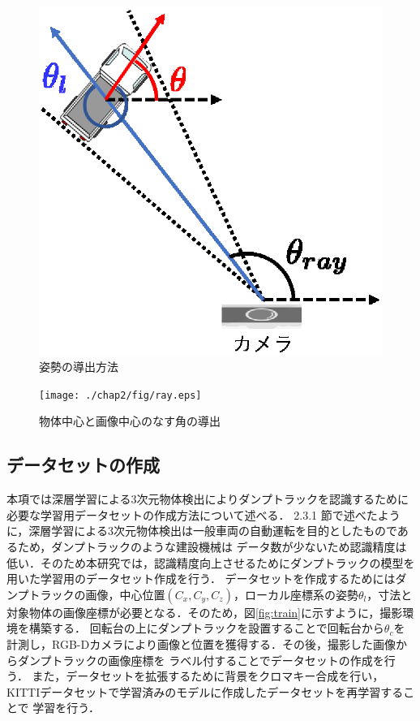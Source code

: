 \begin{figure}[b]
    \begin{center}
    \includegraphics[width=0.5\columnwidth]{./chap2/fig/3DBox.eps}
    \caption{姿勢の導出方法}
    \label{fig:pose}
    \end{center}
\end{figure}

\begin{figure}[b]
    \begin{center}
    \texttt{[image: ./chap2/fig/ray.eps]}
    \caption{物体中心と画像中心のなす角の導出}
    \label{fig:ray}
    \end{center}
\end{figure}
\newpage

\subsection{データセットの作成}
本項では深層学習による3次元物体検出によりダンプトラックを認識するために必要な学習用データセットの作成方法について述べる．
2.3.1 節で述べたように，深層学習による3次元物体検出は一般車両の自動運転を目的としたものであるため，ダンプトラックのような建設機械は
データ数が少ないため認識精度は低い．そのため本研究では，認識精度向上させるためにダンプトラックの模型を用いた学習用のデータセット作成を行う．
データセットを作成するためにはダンプトラックの画像，中心位置$(C_x, C_y, C_z)$，ローカル座標系の姿勢$\theta_l$，寸法と対象物体の画像座標が必要となる．そのため，図\ref{fig:train}に示すように，撮影環境を構築する．
回転台の上にダンプトラックを設置することで回転台から$\theta_c$を計測し，RGB-Dカメラにより画像と位置を獲得する．その後，撮影した画像からダンプトラックの画像座標を
ラベル付することでデータセットの作成を行う．
また，データセットを拡張するために背景をクロマキー合成を行い，KITTIデータセットで学習済みのモデルに作成したデータセットを再学習することで
学習を行う．



